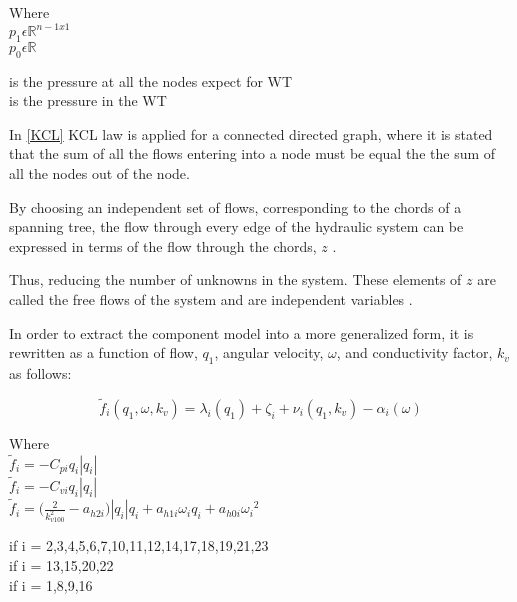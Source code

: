 \begin{minipage}[t]{0.20\textwidth}
Where\\
\hspace*{8mm} $p_1 \epsilon \mathbb{R}^{n-1x1}$  \\
\hspace*{8mm} $p_0 \epsilon \mathbb{R} $ 
\end{minipage}
\begin{minipage}[t]{0.68\textwidth}
\vspace*{2mm}
\hspace*{4mm} is the pressure at all the nodes expect for WT\\
\hspace*{4mm} is the pressure in the WT 
\end{minipage}

In \eqref{KCL} KCL law is applied for a connected directed graph, where it is stated that the sum of all the flows entering 
into a node must be equal the the sum of all the nodes out of the node.

By choosing an independent set of flows, corresponding to the chords of a spanning tree, the 
flow through every edge of the hydraulic system can be expressed in terms of the flow through the chords, $z$ \cite{GraphModel}.

Thus, reducing the number of unknowns in the system. These elements of $z$ are called the free 
flows of the system and are independent variables \cite{GraphTheoryCarsten}.


In order to extract the component model into a more generalized form, it is rewritten as a function of flow, $q_1$, angular velocity, $\omega$, and conductivity factor, $k_v$ as follows:

\begin{equation}
  \tilde{f}_i(q_1, \omega, k_v) = \lambda_i(q_1) + \zeta_i + \nu_i(q_1, k_v) - \alpha_i(\omega)
  \label{ComponentFunction}
\end{equation}

\begin{minipage}[t]{0.20\textwidth}
Where\\
\hspace*{2mm} $\tilde{f}_i = -C_{pi} q_i |q_i|$  \\
\hspace*{2mm} $\tilde{f}_i = -C_{vi} q_i |q_i|$  \\
\hspace*{2mm} $\tilde{f}_i = \Big(\frac{2}{k_{v100}^2} - a_{h2i}\Big)|q_i| q_i  + a_{h1i} \omega_{i} q_i + a_{h0i}{\omega_i}^2$  
\end{minipage}
\begin{minipage}[t]{0.68\textwidth}
\vspace*{2mm}
\hspace*{25mm} if i = 2,3,4,5,6,7,10,11,12,14,17,18,19,21,23\\
\hspace*{25mm} if i = 13,15,20,22						   \\
\hspace*{65mm} if i = 1,8,9,16						   
\end{minipage}

